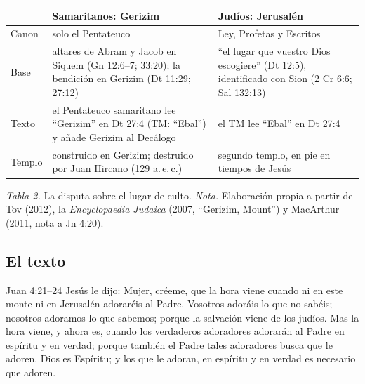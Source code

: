 \begin{center}\small\renewcommand{\arraystretch}{1.22}
\begin{tabular}{@{}L{2.2cm}L{6.0cm}L{6.0cm}@{}}
\toprule
 & \textbf{Samaritanos: Gerizim} & \textbf{Judíos: Jerusalén} \\ \midrule
Canon & solo el Pentateuco & Ley, Profetas y Escritos \\
Base & altares de Abram y Jacob en Siquem (Gn 12:6--7; 33:20); la bendición en Gerizim (Dt 11:29; 27:12) & ``el lugar que \SENOR{} vuestro Dios escogiere'' (Dt 12:5), identificado con Sion (2 Cr 6:6; Sal 132:13) \\
Texto & el Pentateuco samaritano lee ``Gerizim'' en Dt 27:4 (TM: ``Ebal'') y añade Gerizim al Decálogo & el TM lee ``Ebal'' en Dt 27:4 \\
Templo & construido en Gerizim; destruido por Juan Hircano (129 a.\,e.\,c.) & segundo templo, en pie en tiempos de Jesús \\
\bottomrule
\end{tabular}\par
{\footnotesize\color{gris}\textit{Tabla 2.} La disputa sobre el lugar de culto. \textit{Nota.} Elaboración propia a partir de Tov (2012), la \emph{Encyclopaedia Judaica} (2007, ``Gerizim, Mount'') y MacArthur (2011, nota a Jn 4:20).}
\end{center}


\subsection{El texto}

\begin{verso}{Juan 4:21–24}
Jesús le dijo: Mujer, créeme, que la hora viene cuando ni en este monte ni en Jerusalén adoraréis al Padre. Vosotros adoráis lo que no sabéis; nosotros adoramos lo que sabemos; porque la salvación viene de los judíos. Mas la hora viene, y ahora es, cuando los verdaderos adoradores adorarán al Padre en espíritu y en verdad; porque también el Padre tales adoradores busca que le adoren. Dios es Espíritu; y los que le adoran, en espíritu y en verdad es necesario que adoren.
\end{verso}

